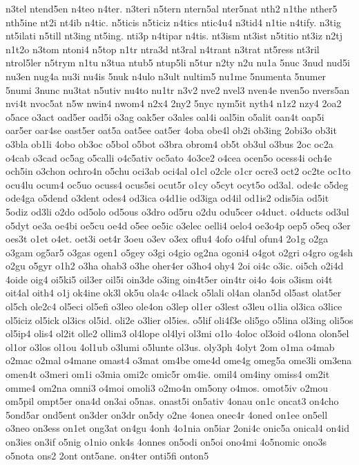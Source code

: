 {n3tel
ntend5en
n4teo
n4ter.
n3teri
n5tern
ntern5al
nter5nat
nth2
n1the
nther5
nth5ine
nt2i
nt4ib
n4tic.
n5ticis
n5ticiz
n4tics
ntic4u4
n3tid4
n1tie
n4tify.
n3tig
nt5ilati
n5till
nt3ing
nt5ing.
nti3p
n4tipar
n4tis.
nt3ism
nt3ist
n5titio
nt3iz
n2tj
n1t2o
n3tom
ntoni4
n5top
n1tr
ntra3d
nt3ral
n4trant
n3trat
nt5ress
nt3ril
ntrol5ler
n5trym
n1tu
n3tua
ntub5
ntup5li
n5tur
n2ty
n2u
nu1a
5nuc
3nud
nud5i
nu3en
nug4a
nu3i
nu4is
5nuk
n4ulo
n3ult
nultim5
nu1me
5numenta
5numer
5numi
3nunc
nu3tat
n5utiv
nu4to
nu1tr
n3v2
nve2
nvel3
nven4e
nven5o
nvers5an
nvi4t
nvoc5at
n5w
nwin4
nwom4
n2x4
2ny2
5nyc
nym5it
nyth4
n1z2
nzy4
2oa2
o5ace
o3act
oad5er
oad5i
o3ag
oak5er
o3ales
oal4i
oal5in
o5alit
oan4t
oap5i
oar5er
oar4se
oast5er
oat5a
oat5ee
oat5er
4oba
obe4l
ob2i
ob3ing
2obi3o
ob3it
o3bla
ob1li
4obo
ob3oc
o5bol
o5bot
o3bra
obrom4
ob5t
ob3ul
o3bus
2oc
oc2a
o4cab
o3cad
oc5ag
o5calli
o4c5ativ
oc5ato
4o3ce2
o4cea
ocen5o
ocess4i
och4e
och5in
o3chon
ochro4n
o5chu
oci3ab
oci4al
o1cl
o2cle
o1cr
ocre3
oct2
oc2te
oc1to
ocu4lu
ocum4
oc5uo
ocuss4
ocus5si
ocut5r
o1cy
o5cyt
ocyt5o
od3al.
ode4c
o5deg
ode4ga
o5dend
o3dent
odes4
od3ica
o4d1ie
od3iga
od4il
od1is2
odis5ia
od5it
5odiz
od3li
o2do
od5olo
od5ous
o3dro
od5ru
o2du
odu5cer
o4duct.
o4ducts
od3ul
o5dyt
oe3a
oe4bi
oe5cu
oe4d
o5ee
oe5ic
o3elec
oelli4
oelo4
oe3o4p
oep5
o5eq
o3er
oes3t
o1et
o4et.
oet3i
oet4r
3oeu
o3ev
o3ex
oflu4
4ofo
o4ful
ofun4
2o1g
o2ga
o3gam
og5ar5
o3gas
ogen1
o5gey
o3gi
o4gio
og2na
ogoni4
o4got
o2gri
o4gro
og4sh
o2gu
o5gyr
o1h2
o3ha
ohab3
o3he
oher4er
o3ho4
ohy4
2oi
oi4c
o3ic.
oi5ch
o2i4d
4oide
oig4
oi5ki5
oil3er
oil5i
oin3de
o3ing
oin4t5er
oin4tr
oi4o
4ois
o3ism
oi4t
oit4al
oith4
o1j
ok4ine
ok3l
ok5u
ola4c
o4lack
o5lali
ol4an
olan5d
ol5ast
olat5er
ol5ch
ole2c4
ol5eci
ol5efi
o3leo
ole4on
o3lep
ol1er
o3lest
o3leu
o1lia
ol3ica
o3lice
ol5iciz
ol5ick
ol3ics
ol5id.
oli2e
o3lier
ol5ies.
o5lif
oli4f3e
oli5go
o5lina
ol3ing
oli5os
ol5ip4
olis4
ol2it
olle2
ollim3
ol4lope
ol4lyi
ol3mi
o1lo
4oloc
ol3oid
o4lona
olon5el
ol1or
o3los
ol1ou
4ol1ub
o3lumi
o5lunte
ol3us.
oly3ph
4olyt
2om
o1ma
o4mab
o2mac
o2mal
o4mane
omast4
o3mat
om4be
ome4d
ome4g
omeg5a
ome3li
om3ena
omen4t
o3meri
om1i
o3mia
omi2c
omic5r
om4ie.
omil4
om4iny
omiss4
om2it
omme4
om2na
omni3
o4moi
omoli3
o2mo4n
om5ony
o4mos.
omot5iv
o2mou
om5pil
ompt5er
ona4d
on3ai
o5nas.
onast5i
on5ativ
4onau
on1c
oncat3
on4cho
5ond5ar
ond5ent
on3der
on3dr
on5dy
o2ne
4onea
onec4r
4oned
on1ee
on5ell
o3neo
on3ess
on1et
ong3at
on4gu
4onh
4o1nia
on5iar
2oni4c
onic5a
onical4
on4id
on3ies
on3if
o5nig
o1nio
onk4s
4onnes
on5odi
on5oi
ono4mi
4o5nomic
ono3s
o5nota
ons2
2ont
ont5ane.
on4ter
onti5fi
onton5
}
